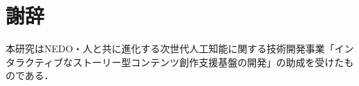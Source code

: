 \documentclass[a4j]{jarticle}
\begin{document}
\maketitle
\thispagestyle{empty}













\section*{謝辞}
本研究はNEDO・人と共に進化する次世代人工知能に関する技術開発事業「インタラクティブなストーリー型コンテンツ創作支援基盤の開発」の助成を受けたものである．

\end{document}
